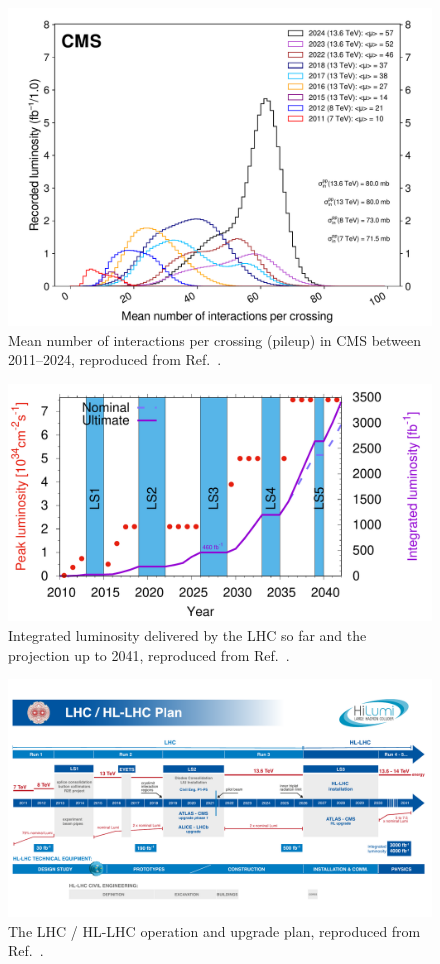 \begin{figure}[ht!]
    \centering
    \includegraphics[width=\textwidth]{figures/02-CMS/lhc/pileup_allYears}
    \caption{Mean number of interactions per crossing (pileup) in CMS between 2011--2024, reproduced from Ref.~\cite{cmslumi2024}.}
    \label{fig:02_lhc_pileup}
\end{figure}


\begin{figure}[ht!]
    \centering
    \includegraphics[width=\textwidth]{figures/02-CMS/lhc/luminosity.png}
    \caption{Integrated luminosity delivered by the LHC so far and the projection up to 2041, reproduced from Ref.~\cite{lhclumi}.}
    \label{fig:02_lhc_luminosity}
\end{figure}

\begin{figure}[ht!]
    \centering
    \includegraphics[width=\textwidth]{figures/02-CMS/lhc/HL-LHC_October2024.pdf}
    \caption{The LHC / HL-LHC operation and upgrade plan, reproduced from Ref.~\cite{hllhcplan}.}
    \label{fig:02_lhc_plan}
\end{figure}